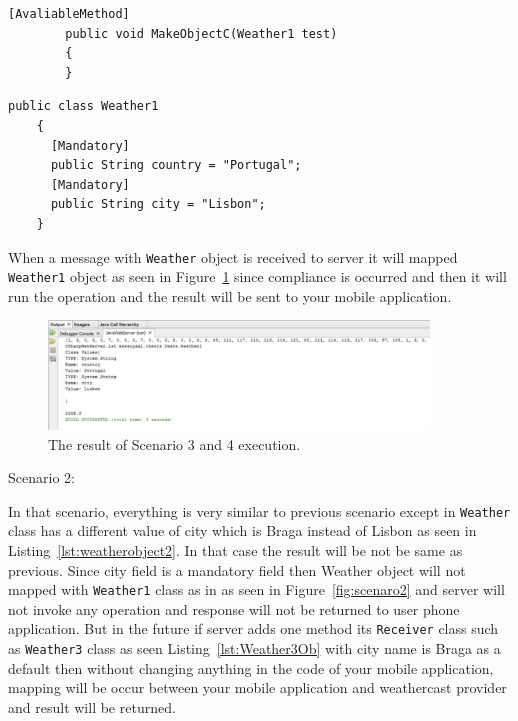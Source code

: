 \begin{lstlisting}[caption=AvaliableMethod notation in Receiver Class, label=lst:weather2]
        [AvaliableMethod]
        public void MakeObjectC(Weather1 test)
        {
        }
\end{lstlisting}

\begin{lstlisting}[caption=Weather1 object in Receiver, label=lst:avaliablemethod]
  public class Weather1
    {
      [Mandatory]
      public String country = "Portugal";
      [Mandatory]
      public String city = "Lisbon";
    }
\end{lstlisting}

When a message with {\tt Weather} object is received to server it will mapped {\tt Weather1} object as seen in Figure~\ref{fig:scenaro3} since compliance is occurred and then it will run the operation and the result will be sent to your mobile application.
\begin{figure}[!htb]
  \centering
  \includegraphics[width=0.9\textwidth]{Figures/scenario4.png}
  \caption[The result of Scenario 1,3 and 4 execution.]{The result of Scenario 3 and 4 execution.}
  \label{fig:scenaro3}
\end{figure}

Scenario 2:

In that scenario, everything is very similar to previous scenario except in {\tt Weather} class has a different value of city which is Braga instead of Lisbon as seen in Listing~\ref{lst:weatherobject2}. In that case the result will be not be same as previous. Since city field is a mandatory field then Weather object will not mapped with {\tt Weather1} class as in as seen in Figure~\ref{fig:scenaro2} and server will not invoke any operation and response will not be returned to user phone application. But in the future if server adds one method its {\tt Receiver} class such as {\tt Weather3} class as seen Listing~\ref{lst:Weather3Ob} with city name is Braga as a default  then without changing anything in the code of your mobile application, mapping will be occur between your mobile application and weathercast provider and result will be returned.

